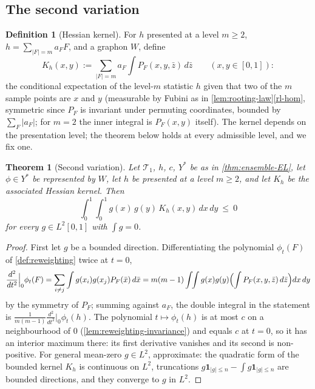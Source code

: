 \documentclass[11pt]{article}
\newtheorem{theorem}{Theorem}
\theoremstyle{definition}
\newtheorem{definition}[definition]{Definition}
\newcommand{\T}{\mathcal{T}}
\newcommand{\one}{\mathbf 1}
\begin{document}
\subsection{The second variation}

\begin{definition}[Hessian kernel]\label{def:hessian-kernel}
For $h$ presented at a level $m\ge2$, $h=\sum_{|F|=m}a_FF$, and a graphon $W$, define
\[
  K_h(x,y):=\sum_{|F|=m}a_F\int P_F(x,y,\bar z)\,d\bar z
  \qquad(x,y\in[0,1]):
\]
the conditional expectation of the level-$m$ statistic $h$ given that two of the $m$
sample points are $x$ and $y$ (measurable by Fubini as in
\cref{lem:rooting-law}\ref{rl-hom}, symmetric since $P_F$ is invariant under permuting
coordinates, bounded by $\sum_F|a_F|$; for $m=2$ the inner integral is
$P_F(x,y)$ itself).  The kernel depends on the presentation level; the theorem below
holds at every admissible level, and we fix one.
\end{definition}

\begin{theorem}[Second variation]\label{thm:second-variation}
Let $\T_1$, $h$, $c$, $Y^\ast$ be as in \cref{thm:ensemble-EL}, let $\phi\in Y^\ast$ be
represented by $W$, let $h$ be presented at a level $m\ge2$, and let $K_h$ be the
associated Hessian kernel.  Then
\[
  \int_0^1\!\!\int_0^1 g(x)\,g(y)\,K_h(x,y)\,dx\,dy\ \le\ 0
\]
for every $g\in L^2[0,1]$ with $\int g=0$.
\end{theorem}

\begin{proof}
First let $g$ be a bounded direction.  Differentiating the polynomial
$\phi_t(F)$ of \cref{def:reweighting} twice at $t=0$,
\[
  \frac{d^2}{dt^2}\Big|_0\phi_t(F)
  =\sum_{i\neq j}\int g(x_i)g(x_j)P_F(\bar x)\,d\bar x
  =m(m-1)\int\!\!\int g(x)g(y)\Bigl(\int P_F(x,y,\bar z)\,d\bar z\Bigr)dx\,dy
\]
by the symmetry of $P_F$; summing against $a_F$, the double integral in the statement
is $\frac1{m(m-1)}\frac{d^2}{dt^2}\big|_0\phi_t(h)$.  The polynomial
$t\mapsto\phi_t(h)$ is at most $c$ on a neighbourhood of $0$
(\cref{lem:reweighting-invariance}) and equals $c$ at $t=0$, so it has an interior
maximum there: its first derivative vanishes and its second is non-positive.  For general
mean-zero $g\in L^2$, approximate: the quadratic form of the bounded kernel $K_h$ is
continuous on $L^2$, truncations $g\one_{|g|\le n}-\int g\one_{|g|\le n}$ are bounded
directions, and they converge to $g$ in $L^2$.
\end{proof}
\end{document}
